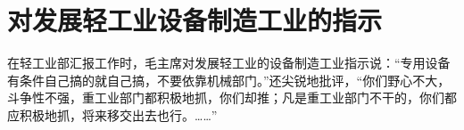 \section[对发展轻工业设备制造工业的指示（一九五六年）]{对发展轻工业设备制造工业的指示}


在轻工业部汇报工作时，毛主席对发展轻工业的设备制造工业指示说：“专用设备有条件自己搞的就自己搞，不要依靠机械部门。”还尖锐地批评，“你们野心不大，斗争性不强，重工业部门都积极地抓，你们却推；凡是重工业部门不干的，你们都应积极地抓，将来移交出去也行。……”


